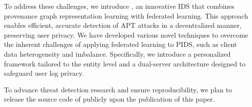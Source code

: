 To address these challenges, we introduce \Sys, an innovative IDS that combines provenance graph representation learning with federated learning. This approach enables efficient, accurate detection of APT attacks in a decentralized manner, preserving user privacy. We have developed various novel techniques to overcome the inherent challenges of applying federated learning to PIDS, such as client data heterogeneity and imbalance. Specifically, we introduce a personalized \gnnshort framework tailored to the entity level and a dual-server architecture designed to safeguard user log privacy.









 To advance threat detection research and ensure reproducibility, we plan to release the source code of \Sys publicly upon the publication of this paper.
